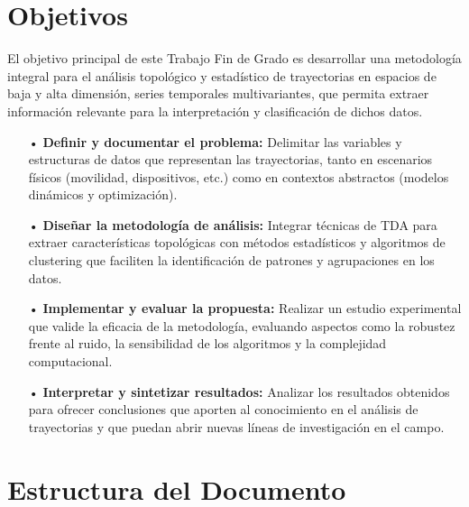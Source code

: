 \vspace{2cm}

\section{Objetivos} \label{sct:intro:objetivos}

El objetivo principal de este Trabajo Fin de Grado es desarrollar una metodología integral para el análisis topológico y estadístico de trayectorias en espacios de baja y alta dimensión, series temporales multivariantes, que permita extraer información relevante para la interpretación y clasificación de dichos datos.

\begin{itemize}


\item[•] \textbf{Definir y documentar el problema:} Delimitar las variables y estructuras de datos que representan las trayectorias, tanto en escenarios físicos (movilidad, dispositivos, etc.) como en contextos abstractos (modelos dinámicos y optimización).

\item[•] \textbf{Diseñar la metodología de análisis:} Integrar técnicas de TDA para extraer características topológicas con métodos estadísticos y algoritmos de clustering que faciliten la identificación de patrones y agrupaciones en los datos.

\item[•] \textbf{Implementar y evaluar la propuesta:} Realizar un estudio experimental que valide la eficacia de la metodología, evaluando aspectos como la robustez frente al ruido, la sensibilidad de los algoritmos y la complejidad computacional.

\item[•] \textbf{Interpretar y sintetizar resultados:} Analizar los resultados obtenidos para ofrecer conclusiones que aporten al conocimiento en el análisis de trayectorias y que puedan abrir nuevas líneas de investigación en el campo.
\end{itemize}


\section{Estructura del Documento} \label{sct:intro_estructura}

